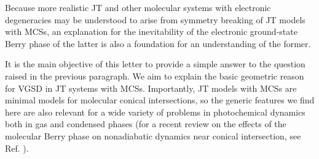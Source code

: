 \documentclass[superscriptaddress,showpacs,amsmath,amssymb,pra,twocolumn]{revtex4-1}
\begin{document}
Because more realistic JT and other molecular systems with electronic
degeneracies may be understood to arise from symmetry breaking of
JT models with MCSs, an explanation for the inevitability of the electronic
ground-state Berry phase of the latter is also a foundation for an
understanding of the former.


It is the main objective of this letter to provide a simple answer to the
question raised in the previous paragraph. We aim to explain the basic
geometric reason for VGSD in JT systems
with MCSs. 
Importantly, JT models with MCSs
are minimal models for molecular conical intersections, so the
generic features we find here are also relevant for a wide variety
of problems in photochemical dynamics both in gas and condensed phases
\cite{atanasov_vibronic_2011,domcke2011conical,halasz_conical_2011,domcke_role_2012, gatti2014molecular} (for a recent review on the effects of the molecular Berry phase on nonadiabatic dynamics near conical intersection, see Ref. \cite{ryabinkin_geometric_2017-1}).
\end{document}
